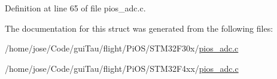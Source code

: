 Definition at line 65 of file pios\-\_\-adc.\-c.



The documentation for this struct was generated from the following files\-:\begin{DoxyCompactItemize}
\item 
/home/jose/\-Code/gui\-Tau/flight/\-Pi\-O\-S/\-S\-T\-M32\-F30x/\hyperlink{_s_t_m32_f30x_2pios__adc_8c}{pios\-\_\-adc.\-c}\item 
/home/jose/\-Code/gui\-Tau/flight/\-Pi\-O\-S/\-S\-T\-M32\-F4xx/\hyperlink{_s_t_m32_f4xx_2pios__adc_8c}{pios\-\_\-adc.\-c}\end{DoxyCompactItemize}

